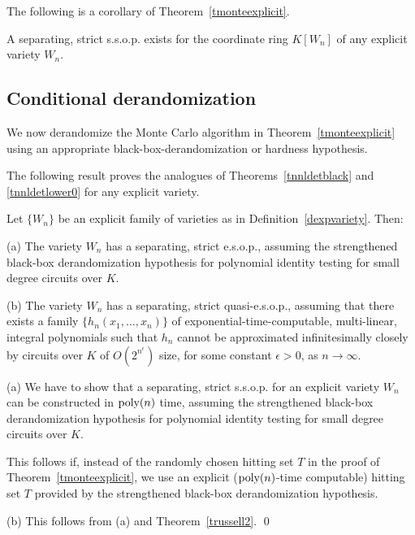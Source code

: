 \documentclass[11pt]{article}
\begin{document}
The following is a corollary of Theorem~\ref{tmonteexplicit}.

\begin{cor}  \label{corssopexistsgen}
A  separating, strict  s.s.o.p. exists for the coordinate ring $K[W_n]$ of any explicit variety $W_n$.
\end{cor}

\subsection{Conditional derandomization} \label{sremove}
We now  derandomize the 
Monte Carlo algorithm in Theorem~\ref{tmonteexplicit}  using an appropriate 
black-box-derandomization or hardness hypothesis.


The following result proves the analogues of   Theorems~\ref{tnnldetblack} and \ref{tnnldetlower0} 
for any explicit variety.

\begin{theorem} \label{tnnlexpfull}
Let  $\{W_n\}$ be 
an explicit family of varieties as in Definition~\ref{dexpvariety}. Then:

\noindent (a) The variety $W_n$ has a  separating, strict e.s.o.p.,
assuming the strengthened black-box derandomization hypothesis for polynomial identity testing for small degree circuits  over $K$. 

\noindent (b) The variety $W_n$ has a  separating, strict quasi-e.s.o.p.,  assuming that 
there exists a family $\{h_n(x_1,\ldots,x_n)\}$ 
of  exponential-time-computable, multi-linear, integral polynomials
such that $h_n$ cannot be approximated infinitesimally closely by  circuits over $K$ of $O(2^{n^\epsilon})$ size,  for some 
constant $\epsilon>0$, as $n \rightarrow \infty$.
\end{theorem}

\proof

\noindent (a)  We have to show that 
a separating, strict s.s.o.p. for an explicit variety $W_n$
can be constructed in ${\mbox {poly}}(n)$ time,
assuming the strengthened black-box derandomization hypothesis for polynomial identity testing for small degree circuits  over $K$. 

This follows if,
instead of the randomly chosen hitting set $T$ in the proof of Theorem~\ref{tmonteexplicit},
we use an explicit (${\mbox {poly}}(n)$-time computable) hitting set $T$  provided by the  strengthened black-box derandomization hypothesis. 

\noindent (b) This follows from  (a) and Theorem~\ref{trussell2}. 
\qed 
\end{document}
